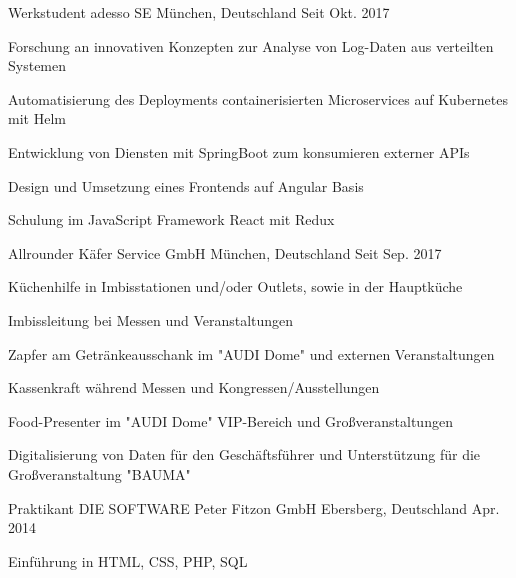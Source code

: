\documentclass[11pt, a4paper]{awesome-cv}
\begin{document}
\begin{cventries}

  \cventry
  {Werkstudent} %
  {adesso SE} %
  {München, Deutschland} %
  {Seit Okt. 2017} %
  {
    \begin{cvitems} %
      \item {Forschung an innovativen Konzepten zur Analyse von Log-Daten aus verteilten Systemen}
      \item {Automatisierung des Deployments containerisierten Microservices auf Kubernetes mit Helm}
      \item {Entwicklung von Diensten mit SpringBoot zum konsumieren externer APIs}
      \item {Design und Umsetzung eines Frontends auf Angular Basis}
      \item {Schulung im JavaScript Framework React mit Redux}
    \end{cvitems}
  }

  \cventry
  {Allrounder} %
  {Käfer Service GmbH} %
  {München, Deutschland} %
  {Seit Sep. 2017} %
  {
    \begin{cvitems} %
      \item {Küchenhilfe in Imbisstationen und/oder Outlets, sowie in der Hauptküche}
      \item {Imbissleitung bei Messen und Veranstaltungen}
      \item {Zapfer am Getränkeausschank im "AUDI Dome" und externen Veranstaltungen}
      \item {Kassenkraft während Messen und Kongressen/Ausstellungen}
      \item {Food-Presenter im "AUDI Dome" VIP-Bereich und Großveranstaltungen}
      \item {Digitalisierung von Daten für den Geschäftsführer und Unterstützung für die Großveranstaltung "BAUMA"}
    \end{cvitems}
  }

  \cventry
  {Praktikant} %
  {DIE SOFTWARE Peter Fitzon GmbH} %
  {Ebersberg, Deutschland} %
  {Apr. 2014} %
  {
    \begin{cvitems} %
      \item {Einführung in HTML, CSS, PHP, SQL}
    \end{cvitems}
  }

\end{cventries}
\end{document}
